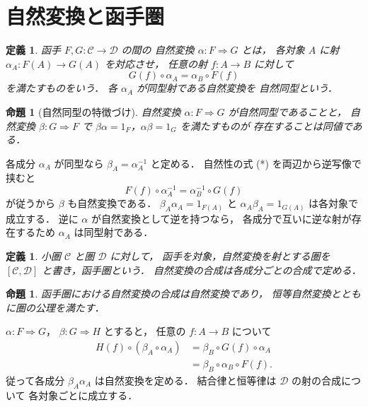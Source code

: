 \documentclass[a5paper,10pt,onecolumn]{jsarticle}
\makeatletter
\theoremstyle{mathnotetheorem}
\newtheorem{definition}[theorem]{定義}
\newtheorem{proposition}[theorem]{命題}
\renewcommand{\proofname}{証明}
\renewenvironment{proof}[1][\proofname]{%
  \par\pushQED{\qed}\normalfont\topsep4\p@\@plus2\p@\relax
  \trivlist\item[\hskip\labelsep\bfseries #1]\ignorespaces
}{\popQED\endtrivlist\@endpefalse}
\makeatother
\begin{document}
\section{自然変換と函手圏}

\begin{definition}
函手 $F,G:\mathcal C\to\mathcal D$ の間の
\emph{自然変換} $\alpha:F\Rightarrow G$ とは，
各対象 $A$ に射
$\alpha_A:F(A)\to G(A)$ を対応させ，
任意の射 $f:A\to B$ に対して
\[
 G(f)\circ\alpha_A
 =\alpha_B\circ F(f)
 \tag{*}
\]
を満たすものをいう．
各 $\alpha_A$ が同型射である自然変換を
\emph{自然同型}という．
\end{definition}

\begin{proposition}[自然同型の特徴づけ]\label{prop:nat-iso}
自然変換 $\alpha:F\Rightarrow G$ が自然同型であることと，
自然変換 $\beta:G\Rightarrow F$ で
$\beta\alpha=1_F$，$\alpha\beta=1_G$ を満たすものが
存在することは同値である．
\end{proposition}
\begin{proof}
各成分 $\alpha_A$ が同型なら
$\beta_A=\alpha_A^{-1}$ と定める．
自然性の式 (*) を両辺から逆写像で挟むと
\[
 F(f)\circ\alpha_A^{-1}
 =\alpha_B^{-1}\circ G(f)
\]
が従うから $\beta$ も自然変換である．
$\beta_A\alpha_A=1_{F(A)}$ と
$\alpha_A\beta_A=1_{G(A)}$ は各対象で成立する．
逆に $\alpha$ が自然変換として逆を持つなら，
各成分で互いに逆な射が存在するため
$\alpha_A$ は同型射である．
\end{proof}

\begin{definition}
小圏 $\mathcal C$ と圏 $\mathcal D$ に対して，
函手を対象，自然変換を射とする圏を
$[\mathcal C,\mathcal D]$ と書き，\emph{函手圏}という．
自然変換の合成は各成分ごとの合成で定める．
\end{definition}

\begin{proposition}\label{prop:functor-category}
函手圏における自然変換の合成は自然変換であり，
恒等自然変換とともに圏の公理を満たす．
\end{proposition}
\begin{proof}
$\alpha:F\Rightarrow G$，
$\beta:G\Rightarrow H$ とすると，
任意の $f:A\to B$ について
\begin{align*}
 H(f)\circ(\beta_A\circ\alpha_A)
 &=\beta_B\circ G(f)\circ\alpha_A\\
 &=\beta_B\circ\alpha_B\circ F(f).
\end{align*}
従って各成分 $\beta_A\alpha_A$ は自然変換を定める．
結合律と恒等律は $\mathcal D$ の射の合成について
各対象ごとに成立する．
\end{proof}
\end{document}

